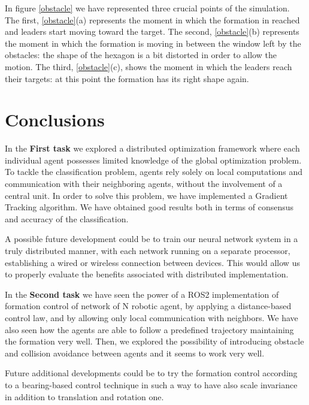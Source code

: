 \documentclass[a4paper,11pt,oneside]{book}
\begin{document}
\bigskip
In figure \ref{obstacle} we have represented three crucial points of the simulation. The first, \ref{obstacle}(a) represents the moment in which the formation in reached and leaders start moving toward the target. The second, \ref{obstacle}(b) represents the moment in which the formation is moving in between the window left by the obstacles: the shape of the hexagon is a bit distorted in order to allow the motion. The third, \ref{obstacle}(c), shows the moment in which the leaders reach their targets: at this point the formation has its right shape again.




\chapter*{Conclusions}
In the \textbf{First task} we explored a distributed optimization framework where each individual agent possesses limited knowledge of the global optimization problem. To tackle the classification problem, agents rely solely on local computations and communication with their neighboring agents, without the involvement of a central unit. In order to solve this problem, we have implemented a Gradient Tracking algorithm. 
We have obtained good results both in terms of consensus and accuracy of the classification. 

A possible future development could be to train our neural network system in a truly distributed manner, with each network running on a separate processor, establishing a wired or wireless connection between devices. This would allow us to properly evaluate the benefits associated with distributed implementation.

\bigskip
In the \textbf{Second task} we have seen the power of a ROS2 implementation of formation control of network of N robotic agent, by applying a distance-based control law, and by allowing only local communication with neighbors. We have also seen how the agents are able to follow a predefined trajectory maintaining the formation very well.
Then, we explored the possibility of introducing obstacle and collision avoidance between agents and it seems to work very well. 

Future additional developments could be to try the formation control according to a bearing-based control technique in such a way to have also scale invariance in addition to translation and rotation one.


%


\end{document}
